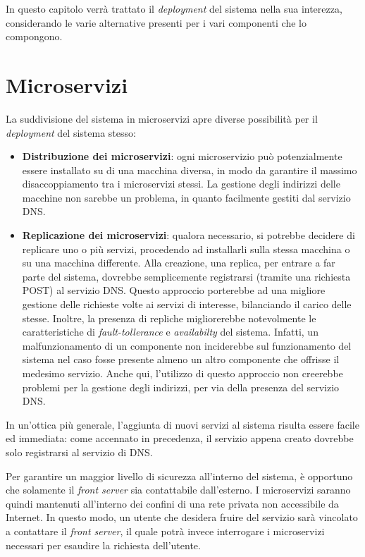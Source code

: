 \documentclass[a4paper,12pt]{report}
\begin{document}
In questo capitolo verrà trattato il \emph{deployment} del sistema nella sua interezza, considerando le varie alternative presenti per i vari componenti che lo compongono.

\section{Microservizi}

La suddivisione del sistema in microservizi apre diverse possibilità per il \emph{deployment} del sistema stesso:
\begin{itemize}
	\item \textbf{Distribuzione dei microservizi}: ogni microservizio può potenzialmente essere installato su di una macchina diversa, in modo da garantire il massimo disaccoppiamento tra i microservizi stessi. La gestione degli indirizzi delle macchine non sarebbe un problema, in quanto facilmente gestiti dal servizio DNS.
	\item \textbf{Replicazione dei microservizi}: qualora necessario, si potrebbe decidere di replicare uno o più servizi, procedendo ad installarli sulla stessa macchina o su una macchina differente. Alla creazione, una replica, per entrare a far parte del sistema, dovrebbe semplicemente registrarsi (tramite una richiesta POST) al servizio DNS. Questo approccio porterebbe ad una migliore gestione delle richieste volte ai servizi di interesse, bilanciando il carico delle stesse. Inoltre, la presenza di repliche migliorerebbe notevolmente le caratteristiche di \emph{fault-tollerance} e \emph{availabilty} del sistema. Infatti, un malfunzionamento di un componente non inciderebbe sul funzionamento del sistema nel caso fosse presente almeno un altro componente che offrisse il medesimo servizio. Anche qui, l'utilizzo di questo approccio non creerebbe problemi per la gestione degli indirizzi, per via della presenza del servizio DNS.
\end{itemize}

In un'ottica più generale, l'aggiunta di nuovi servizi al sistema risulta essere facile ed immediata: come accennato in precedenza, il servizio appena creato dovrebbe solo registrarsi al servizio di DNS.

Per garantire un maggior livello di sicurezza all'interno del sistema, è opportuno che solamente il \emph{front server} sia contattabile dall'esterno. I microservizi saranno quindi mantenuti all'interno dei confini di una rete privata non accessibile da Internet. In questo modo, un utente che desidera fruire del servizio sarà vincolato a contattare il \emph{front server}, il quale potrà invece interrogare i microservizi necessari per esaudire la richiesta dell'utente.
\end{document}
